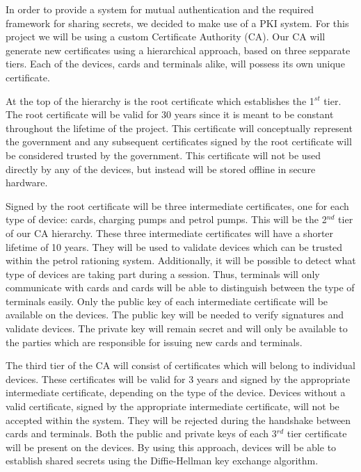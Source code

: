 In order to provide a system for mutual authentication and the required framework for sharing secrets, we decided to make use of a PKI system. For this project we will be using a custom Certificate Authority (CA). Our CA will generate new certificates using a hierarchical approach, based on three sepparate tiers. Each of the devices, cards and terminals alike, will possess its own unique certificate.

At the top of the hierarchy is the root certificate which establishes the 1$^{st}$ tier. The root certificate will be valid for 30 years since it is meant to be constant throughout the lifetime of the project. This certificate will conceptually represent the government and any subsequent certificates signed by the root certificate will be considered trusted by the government. This certificate will not be used directly by any of the devices, but instead will be stored offline in secure hardware.

Signed by the root certificate will be three intermediate certificates, one for each type of device: cards, charging pumps and petrol pumps. This will be the 2$^{nd}$ tier of our CA hierarchy. These three intermediate certificates will have a shorter lifetime of 10 years. They will be used to validate devices which can be trusted within the petrol rationing system. Additionally, it will be possible to detect what type of devices are taking part during a session. Thus, terminals will only communicate with cards and cards will be able to distinguish between the type of terminals easily. Only the public key of each intermediate certificate will be available on the devices. The public key will be needed to verify signatures and validate devices. The private key will remain secret and will only be available to the parties which are responsible for issuing new cards and terminals.

The third tier of the CA will consist of certificates which will belong to individual devices. These certificates will be valid for 3 years and signed by the appropriate intermediate certificate, depending on the type of the device. Devices without a valid certificate, signed by the appropriate intermediate certificate, will not be accepted within the system. They will be rejected during the handshake between cards and terminals. Both the public and private keys of each 3$^{rd}$ tier certificate will be present on the devices. By using this approach, devices will be able to establish shared secrets using the Diffie-Hellman key exchange algorithm.